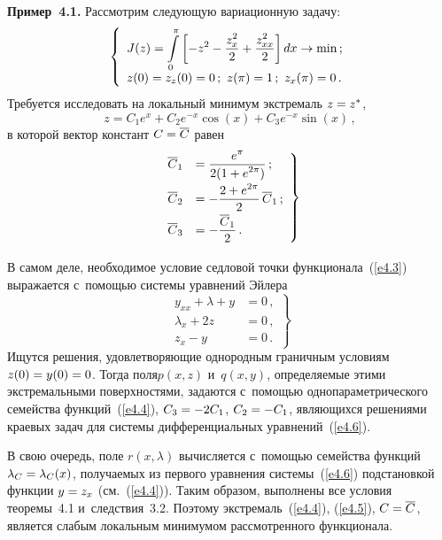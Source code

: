 \begin{multicols}{2}
    \smallskip
    
    \noindent
    \textbf{Пример~4.1.} Рассмотрим следующую вариационную задачу:
    $$
    \left\{ 
    \begin{array}{l}
    J(z)=\displaystyle \int\limits_0^\pi \left[ -z^2 -
\displaystyle\frac{\displaystyle z_x^2\mathstrut}{\displaystyle 2\mathstrut}+\displaystyle\frac{\displaystyle z^2_{xx}\mathstrut}{\displaystyle 2\mathstrut}\right]dx\to \min\,;\\[6pt]
    z(0)=z_z(0)=0\,;\ z(\pi) =1\,;\ z_x(\pi)=0\,.
    \end{array}
    \right.
    $$ 
Требуется исследовать на локальный минимум экстремаль $z\hm= z^*$,
\begin{equation}
z=C_1 e^x +C_2 e^{-x}\cos(x) +C_3 e^{-x}\sin(x)\,,
\label{e4.4}
\end{equation}
в которой вектор констант $C\hm= \overline{C}$ равен
\begin{equation}
\left.
\begin{array}{rl}
\overline{C}_1&=\displaystyle\frac{\displaystyle e^\pi\mathstrut}{\displaystyle 2(1+e^{2\pi})\mathstrut}\,;\\[9pt]
\overline{C}_2&= -\displaystyle\frac{\displaystyle 2+e^{2\pi}\mathstrut}{\displaystyle 2\mathstrut}\,\overline{C}_1\,;\\[6pt]
\overline{C}_3&= -\displaystyle\frac{\displaystyle \overline{C}_1\mathstrut}{\displaystyle 2\mathstrut}\,.
\end{array}
\right\}
\label{e4.5}
\end{equation}
    
    В самом деле, необходимое условие седловой точки функционала~(\ref{e4.3}) 
выражается с~помощью системы уравнений Эйлера 
    \begin{equation}
    \left.
    \begin{array}{rl}
    y_{xx}+\lambda+y&=0\,,\\[3pt]
    \lambda_x+2z&=0\,,\\
    z_x-y&=0\,.
    \end{array}
    \right\}    \label{e4.6}
    \end{equation}
Ищутся решения, удовлетворяющие однородным граничным условиям  $z(0)\hm=y(0)\hm=0$. 
Тогда поля\linebreak $p(x,z)$ и~$q(x,y)$, определяемые этими экстремальными поверхностями, 
задаются с~по\-мощью однопараметрического семейства функций~(\ref{e4.4}), 
$C_3\hm= -2C_1$, $C_2\hm= -C_1$, являющихся решениями \mbox{краевых} задач для 
системы дифференциальных уравнений~(\ref{e4.6}). 

     В свою очередь, поле $r(x,\lambda)$ вычисляется с~по\-мощью семейства 
функций $\lambda_C\hm= \lambda_C(x)$, по\-лу\-ча\-емых из первого уравнения 
системы~(\ref{e4.6}) подстановкой функции $y\hm= z_x$ (см.~(\ref{e4.4})). Таким 
образом, выполнены все условия тео\-ре\-мы~4.1 и~следствия~3.2. Поэтому 
экстремаль~(\ref{e4.4}), (\ref{e4.5}), $C\hm= \overline{C}$, является слабым 
локальным минимумом рассмотренного функционала.


\end{multicols}
